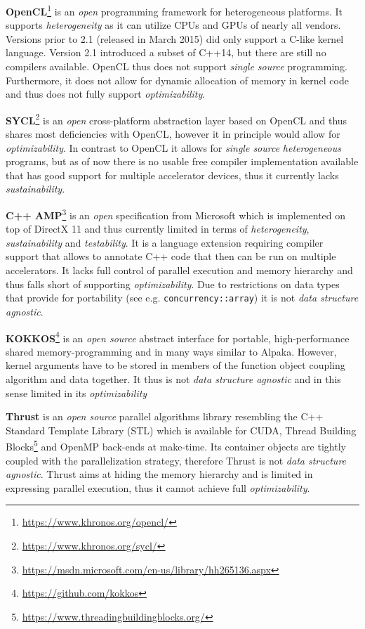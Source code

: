 \documentclass[10pt, twocolumn]{article}
\newcommand{\alpaka}{Alpaka\xspace}
\newcommand{\cuda}{{CUDA}\xspace}
\newcommand{\openmp}{{OpenMP}\xspace}
\newcommand{\opencl}{{OpenCL}\xspace}
\newcommand{\thrust}{{Thrust}\xspace}
\begin{document}
\textbf{OpenCL}\footnote{\url{https://www.khronos.org/opencl/}}
is an \emph{open} programming framework for heterogeneous platforms. It supports \emph{heterogeneity} as it can utilize CPUs and GPUs of nearly all vendors.
Versions prior to 2.1 (released in March 2015) did only support a C-like kernel language.
Version 2.1 introduced a subset of C++14, but there are still no compilers available.
\opencl thus does not support \emph{single source} programming.
Furthermore, it does not allow for dynamic allocation of memory in kernel code and thus does not fully  support \emph{optimizability}.

\textbf{SYCL}\footnote{\url{https://www.khronos.org/sycl/}}
is an \emph{open} cross-platform abstraction layer based on \opencl and thus shares most deficiencies with \opencl, however it in principle would allow for \emph{optimizability}.
In contrast to \opencl it allows for \emph{single source} \emph{heterogeneous} programs, but as of now there is no usable free compiler implementation available that has good support for multiple accelerator devices, thus it currently lacks \emph{sustainability}.

\textbf{C++ AMP}\footnote{\url{https://msdn.microsoft.com/en-us/library/hh265136.aspx}}
is an \emph{open} specification from Microsoft which is implemented on top of DirectX 11 and thus currently limited in terms of \emph{heterogeneity}, \emph{sustainability} and \emph{testability}.
It is a language extension requiring compiler support that allows to annotate C++ code that then can be run on multiple accelerators. It lacks full control of parallel execution and memory hierarchy and thus falls short of supporting \emph{optimizability}. Due to restrictions on data types that provide for portability (see e.g. \texttt{concurrency::array}) it is not \emph{data structure agnostic}.

\textbf{KOKKOS}\footnote{\url{https://github.com/kokkos}}
is an \emph{open source} abstract interface for portable, high-performance shared memory-programming and in many ways similar to \alpaka.
However, kernel arguments have to be stored in members of the function object coupling algorithm and data together. It thus is not \emph{data structure agnostic} and in this sense limited in its \emph{optimizability}



\textbf{Thrust}\cite{bell2012thrust}
is an \emph{open source} parallel algorithms library resembling the C++ Standard Template Library (STL) which is available for \cuda, Thread Building Blocks\footnote{\url{https://www.threadingbuildingblocks.org/}} and \openmp back-ends at make-time. Its container objects are tightly coupled with the parallelization strategy, therefore \thrust is not \emph{data structure agnostic}. \thrust aims at hiding the memory hierarchy and is limited in expressing parallel execution, thus it cannot achieve full \emph{optimizability}.
\end{document}
